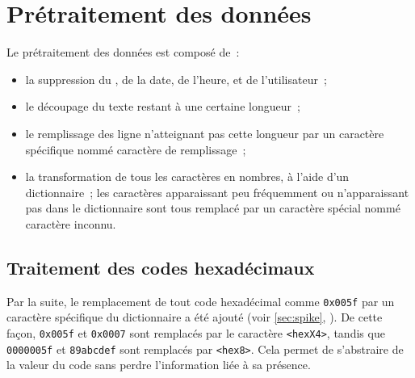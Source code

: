 \pagebreak
\section{Prétraitement des données}\label{def_dict_papud}
Le prétraitement des données est composé de~:
\begin{itemize}
	\item la suppression du , de la date, de l'heure, et de l'utilisateur~;
	\item le découpage du texte restant à une certaine longueur~;
	\item le remplissage des ligne n'atteignant pas cette longueur par un caractère spécifique nommé caractère de remplissage~;
	\item la transformation de tous les caractères en nombres, à l'aide d'un dictionnaire~; les caractères apparaissant peu fréquemment ou n'apparaissant pas dans le dictionnaire sont tous remplacé par un caractère spécial nommé \og caractère inconnu\fg{}.
\end{itemize}

\subsection{Traitement des codes hexadécimaux}\label{hex}
Par la suite, le remplacement de tout code hexadécimal comme \lstinline|0x005f| par un caractère spécifique du dictionnaire a été ajouté (voir \autoref{sec:spike}, ).
De cette façon, \lstinline|0x005f| et \lstinline|0x0007| sont remplacés par le caractère  \lstinline|<hexX4>|, tandis que  \lstinline|0000005f| et  \lstinline|89abcdef| sont remplacés par  \lstinline|<hex8>|.
Cela permet de s'abstraire de la valeur du code sans perdre l'information liée à sa présence.

